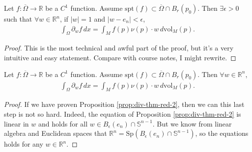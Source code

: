 \begin{prop}\label{prop:div-thm-red-2}
	Let $f: \overline{ \Omega } \to \mathbb{R}$ be a $C^{1}$ function. Assume $\text{spt}(f) \subset \overline{ \Omega } \cap B_{r}(p_{0})$. Then $\exists \epsilon > 0$ such that $\forall w \in \mathbb{R}^{n}$, if $\left| w \right| = 1$ and $\left| w - e_{n} \right| < \epsilon$,
	\begin{align*}
		\int_{\Omega} \partial_{w} f \, dx = \int_{M} f(p) \nu(p) \cdot w \, d \text{vol}_{M}(p).
	\end{align*}
\end{prop}
\begin{proof}
    This is the most technical and awful part of the proof, but it's a very intuitive and easy statement. Compare with course notes, I might rewrite.
\end{proof}

\begin{prop}\label{prop:div-thm-red-3}
	Let $f: \overline{ \Omega } \to \mathbb{R}$ be a $C^{1}$ function. Assume $\text{spt}(f) \subset \overline{ \Omega } \cap B_{r}(p_{0})$. Then $\forall w \in \mathbb{R}^{n}$,
	\begin{align*}
		\int_{\Omega} \partial_{w} f \, dx = \int_{M} f(p) \nu(p) \cdot w \, d \text{vol}_{M}(p).
	\end{align*}
\end{prop}
\begin{proof}
	If we have proven Proposition \ref{prop:div-thm-red-2}, then we can this last step is not so hard. Indeed, the equation of Proposition \ref{prop:div-thm-red-2} is linear in $w$ and holds for all $w \in B_{\epsilon}(e_{n}) \cap \mathbb{S}^{n-1}$. But we know from linear algebra and Euclidean spaces that $\mathbb{R}^{n} = \text{Sp}(B_{\epsilon}(e_{n}) \cap \mathbb{S}^{n-1})$, so the equations holds for any $w \in \mathbb{R}^{n}$.
\end{proof}

